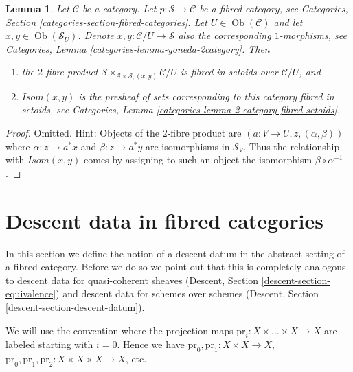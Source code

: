 \documentclass{stacks-project}
\theoremstyle{plain}
\newtheorem{lemma}[subsection]{Lemma}
\theoremstyle{definition}
\theoremstyle{remark}
\numberwithin{equation}{subsection}
\def\Ob{\mathop{\mathrm{Ob}}\nolimits}
\begin{document}
\begin{lemma}
\label{lemma-isom-as-2-fibre-product}
Let $\mathcal{C}$ be a category.
Let $p : \mathcal{S} \to \mathcal{C}$ be a fibred category,
see Categories, Section \ref{categories-section-fibred-categories}.
Let $U \in \Ob(\mathcal{C})$ and let $x, y \in \Ob(\mathcal{S}_U)$.
Denote $x, y : \mathcal{C}/U \to \mathcal{S}$ also the corresponding
$1$-morphisms, see
Categories, Lemma \ref{categories-lemma-yoneda-2category}.
Then
\begin{enumerate}
\item the $2$-fibre product
$\mathcal{S} \times_{\mathcal{S} \times \mathcal{S}, (x, y)} \mathcal{C}/U$
is fibred in setoids over $\mathcal{C}/U$, and
\item $\mathit{Isom}(x, y)$ is the presheaf of sets corresponding
to this category fibred in setoids, see
Categories, Lemma \ref{categories-lemma-2-category-fibred-setoids}.
\end{enumerate}
\end{lemma}

\begin{proof}
Omitted. Hint: Objects of the $2$-fibre product are
$(a : V \to U, z, (\alpha, \beta))$ where
$\alpha : z \to a^*x$ and $\beta : z \to a^*y$ are isomorphisms
in $\mathcal{S}_V$. Thus the relationship with $\mathit{Isom}(x, y)$
comes by assigning to such an object the isomorphism
$\beta \circ \alpha^{-1}$.
\end{proof}







\section{Descent data in fibred categories}
\label{section-descent-data}

\noindent
In this section we define the notion of a descent datum
in the abstract setting of a fibred category. Before we
do so we point out that this is completely analogous to
descent data for quasi-coherent sheaves
(Descent, Section \ref{descent-section-equivalence})
and descent data for schemes over schemes
(Descent, Section \ref{descent-section-descent-datum}).

\medskip\noindent
We will use the convention where the projection maps
$\text{pr}_i : X \times \ldots \times X \to X$
are labeled starting with $i = 0$. Hence we have
$\text{pr}_0, \text{pr}_1 : X \times X  \to X$,
$\text{pr}_0, \text{pr}_1, \text{pr}_2 : X \times X \times X  \to X$,
etc.
\end{document}
